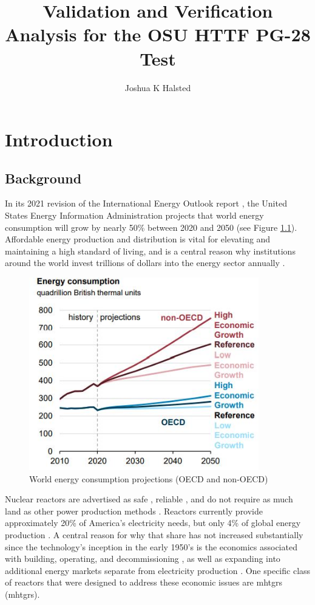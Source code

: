 \documentclass[double,12pt]{beavtex}
\title{Validation and Verification Analysis for the OSU HTTF PG-28 Test}
\author{Joshua K Halsted}
\begin{document}
\maketitle
\mainmatter


\chapter{Introduction}


\section{Background}

In its 2021 revision of the International Energy Outlook report \cite{eia_ieo}, the United States Energy Information Administration projects that world energy consumption will grow by nearly 50\% between 2020 and 2050 (see Figure \ref{fig:EIA_Projections}). Affordable energy production and distribution is vital for elevating and maintaining a high standard of living, and is a central reason why institutions around the world invest trillions of dollars into the energy sector annually \cite{iea_2021}.

\begin{figure}
    \begin{center}
    	\includegraphics[width=10cm]{Figures/EIA_Projections.JPG}
    	\caption{World energy consumption projections (OECD and non-OECD)}
    	\label{fig:EIA_Projections}
    \end{center}
\end{figure}

Nuclear reactors are advertised as safe \cite{WN_Safety}, reliable \cite{mueller_2021}, and do not require as much land as other power production methods \cite{shellenberger_2021}. Reactors currently provide approximately 20\% of America's electricity needs, but only 4\% of global energy production \cite{eia_nuclear}. A central reason for why that share has not increased substantially since the technology's inception in the early 1950's is the economics associated with building, operating, and decommissioning \cite{touran}, as well as expanding into additional energy markets separate from electricity production \cite{process_heat}. One specific class of reactors that were designed to address these economic issues are \acrlong{mhtgr}s (\acrshort{mhtgr}s).  
\end{document}
